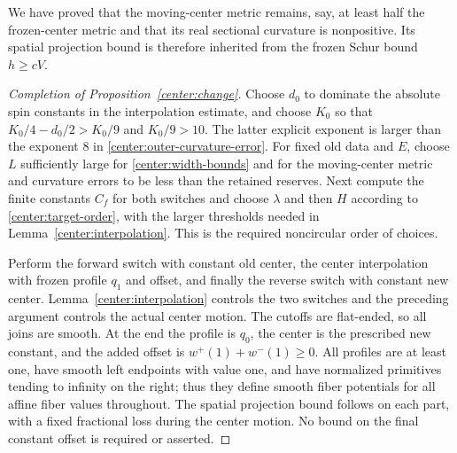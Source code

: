 We have proved that the moving-center metric remains, say, at least half the frozen-center metric and that its real sectional curvature is nonpositive. Its spatial projection bound is therefore inherited from the frozen Schur bound $h\ge cV$.

\begin{proof}[Completion of Proposition~\ref{center:change}]
Choose $d_0$ to dominate the absolute spin constants in the interpolation estimate, and choose $K_0$ so that $K_0/4-d_0/2>K_0/9$ and $K_0/9>10$. The latter explicit exponent is larger than the exponent $8$ in \eqref{center:outer-curvature-error}. For fixed old data and $E$, choose $L$ sufficiently large for \eqref{center:width-bounds} and for the moving-center metric and curvature errors to be less than the retained reserves. Next compute the finite constants $C_f$ for both switches and choose $\lambda$ and then $H$ according to \eqref{center:target-order}, with the larger thresholds needed in Lemma~\ref{center:interpolation}. This is the required noncircular order of choices.

Perform the forward switch with constant old center, the center interpolation with frozen profile $q_1$ and offset, and finally the reverse switch with constant new center. Lemma~\ref{center:interpolation} controls the two switches and the preceding argument controls the actual center motion. The cutoffs are flat-ended, so all joins are smooth. At the end the profile is $q_0$, the center is the prescribed new constant, and the added offset is $w^+(1)+w^-(1)\ge0$. All profiles are at least one, have smooth left endpoints with value one, and have normalized primitives tending to infinity on the right; thus they define smooth fiber potentials for all affine fiber values throughout. The spatial projection bound follows on each part, with a fixed fractional loss during the center motion. No bound on the final constant offset is required or asserted.
\end{proof}
